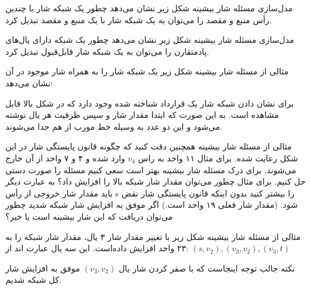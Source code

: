 \begin{itemframe}{مدل‌سازی مسئله شار بیشینه}
\itm
شکل زیر نشان می‌دهد چطور یک شبکه شار با چندین رأس منبع و مقصد را می‌توان به یک شبکه شار با یک منبع و مقصد تبدیل کرد.

\end{itemframe}

\begin{itemframe}{مدل‌سازی مسئله شار بیشینه}
\itm
شکل زیر نشان می‌دهد چطور یک شبکه دارای یال‌های پادمتقارن را می‌توان به یک شبکه شار قابل‌قبول تبدیل کرد.
\end{itemframe}
\begin{itemframe}{مثالی از مسئله شار بیشینه}
\itm
شکل زیر یک شبکه شار را به همراه شار موجود در آن نشان می‌دهد:

\itm
برای نشان دادن شبکه شار یک قرارداد شناخته شده وجود دارد که در شکل بالا قابل مشاهده است. به این صورت که ابتدا مقدار شار و سپس ظرفیت هر یال نوشته می‌شود و این دو عدد به وسیله خط مورب از هم جدا می‌شوند.
\end{itemframe}

\begin{itemframe}{مثالی از مسئله شار بیشینه}
\itm
همچنین دقت کنید که چگونه قانون پایستگی شار در این شکل رعایت شده. برای مثال ۱۱ واحد به راس
$v_4$
وارد شده و ۴ و ۷ واحد از آن خارج می‌شوند.
\itm
برای درک مسئله شار بیشینه بهتر است سعی کنیم مسئله را صورت دستی حل کنیم.
\itm
برای مثال چطور می‌توان مقدار شار شبکه بالا را افزایش داد؟ به عبارت دیگر باید مقدار شار خروجی از رأس s را بیشتر کنید بدون اینکه قانون پایستگی شار نقض شود. (مقدار شار فعلی ۱۹ واحد است.)
\itm
اگر موفق به افزایش شار شبکه شدید چطور می‌توان دریافت که این شار بیشینه است یا خیر؟

\end{itemframe}

\begin{itemframe}{مثالی از مسئله شار بیشینه}
\itm
شکل زیر با تغییر مقدار شار ۳ یال، مقدار شار شبکه را به ۲۳ واحد افزایش داده‌است. این سه یال عبارت اند از:
$(s, v_2), (v_3, v_2), (v_3, t)$

\itm
نکته جالب توجه اینجاست که با صفر کردن شار یال
$(v_3, v_2)$
موفق به افزایش شار کل شبکه شدیم.
\end{itemframe}